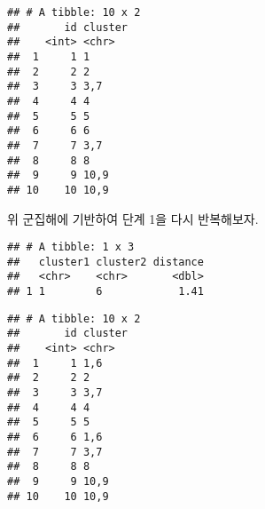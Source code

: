 \documentclass[]{book}
\newenvironment{Shaded}{\begin{snugshade}}{\end{snugshade}}
\newcommand{\DecValTok}[1]{\textcolor[rgb]{0.00,0.00,0.81}{#1}}
\newcommand{\KeywordTok}[1]{\textcolor[rgb]{0.13,0.29,0.53}{\textbf{#1}}}
\newcommand{\NormalTok}[1]{#1}
\newcommand{\OperatorTok}[1]{\textcolor[rgb]{0.81,0.36,0.00}{\textbf{#1}}}
\newcommand{\StringTok}[1]{\textcolor[rgb]{0.31,0.60,0.02}{#1}}
\begin{document}
\begin{Shaded}
\end{Shaded}

\begin{verbatim}
## # A tibble: 10 x 2
##       id cluster
##    <int> <chr>  
##  1     1 1      
##  2     2 2      
##  3     3 3,7    
##  4     4 4      
##  5     5 5      
##  6     6 6      
##  7     7 3,7    
##  8     8 8      
##  9     9 10,9   
## 10    10 10,9
\end{verbatim}

위 군집해에 기반하여 단계 1을 다시 반복해보자.

\begin{Shaded}
\end{Shaded}

\begin{verbatim}
## # A tibble: 1 x 3
##   cluster1 cluster2 distance
##   <chr>    <chr>       <dbl>
## 1 1        6            1.41
\end{verbatim}

\begin{Shaded}
\end{Shaded}

\begin{verbatim}
## # A tibble: 10 x 2
##       id cluster
##    <int> <chr>  
##  1     1 1,6    
##  2     2 2      
##  3     3 3,7    
##  4     4 4      
##  5     5 5      
##  6     6 1,6    
##  7     7 3,7    
##  8     8 8      
##  9     9 10,9   
## 10    10 10,9
\end{verbatim}
\end{document}

